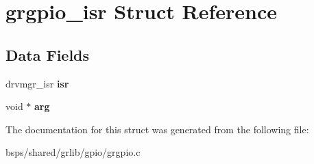 \hypertarget{structgrgpio__isr}{}\section{grgpio\+\_\+isr Struct Reference}
\label{structgrgpio__isr}
\subsection*{Data Fields}
\begin{DoxyCompactItemize}
\item 
\mbox{\label{structgrgpio__isr_a9bb70a83fe410a5c711690ca7e960e83}} 
drvmgr\+\_\+isr {\bfseries isr}
\item 
\mbox{\label{structgrgpio__isr_a6f86cba41312fb8eec639dc99d1cdef7}} 
void $\ast$ {\bfseries arg}
\end{DoxyCompactItemize}


The documentation for this struct was generated from the following file\+:\begin{DoxyCompactItemize}
\item 
bsps/shared/grlib/gpio/grgpio.\+c\end{DoxyCompactItemize}
